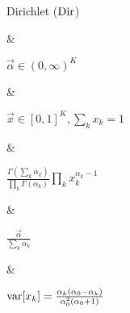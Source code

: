 Dirichlet ($\operatorname{Dir}$)

&

$\vec \alpha \in (0, \infty)^K$

& 

$\vec x \in [0, 1]^K, \sum_k x_k = 1$

&

\(\displaystyle
	\frac{\Gamma\left(\sum_k \alpha_k\right)}{\prod_k \Gamma(\alpha_k)} \prod_k x_k^{\alpha_k - 1}
\)

& 

$\frac{\vec \alpha}{\sum_k \alpha_k}$

&

$\operatorname{\mathrm{var}}[x_k] = \frac{\alpha_k \left(\alpha_0 - \alpha_k \right)}{\alpha_0^2 (\alpha_0 + 1)}$